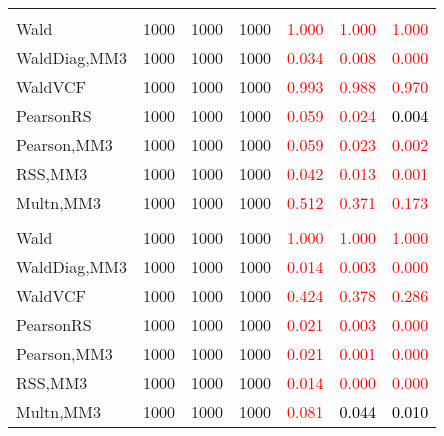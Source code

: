 \documentclass[
]{article}
\begin{document}
\begin{table}[H]
{\begin{tabular}[t]{lrrrrrr}
\addlinespace[0.3em]
\multicolumn{7}{l}{\textbf{2F 10V}}\\
\hspace{1em}Wald & 1000 & 1000 & 1000 & \textcolor{red}{1.000} & \textcolor{red}{1.000} & \vphantom{1} \textcolor{red}{1.000}\\
\hspace{1em}WaldDiag,MM3 & 1000 & 1000 & 1000 & \textcolor{red}{0.034} & \textcolor{red}{0.008} & \textcolor{red}{0.000}\\
\hspace{1em}WaldVCF & 1000 & 1000 & 1000 & \textcolor{red}{0.993} & \textcolor{red}{0.988} & \textcolor{red}{0.970}\\
\hspace{1em}PearsonRS & 1000 & 1000 & 1000 & \textcolor{red}{0.059} & \textcolor{red}{0.024} & \textcolor{black}{0.004}\\
\hspace{1em}Pearson,MM3 & 1000 & 1000 & 1000 & \textcolor{red}{0.059} & \textcolor{red}{0.023} & \textcolor{red}{0.002}\\
\hspace{1em}RSS,MM3 & 1000 & 1000 & 1000 & \textcolor{red}{0.042} & \textcolor{red}{0.013} & \textcolor{red}{0.001}\\
\hspace{1em}Multn,MM3 & 1000 & 1000 & 1000 & \textcolor{red}{0.512} & \textcolor{red}{0.371} & \textcolor{red}{0.173}\\
\addlinespace[0.3em]
\multicolumn{7}{l}{\textbf{3F 15V}}\\
\hspace{1em}Wald & 1000 & 1000 & 1000 & \textcolor{red}{1.000} & \textcolor{red}{1.000} & \textcolor{red}{1.000}\\
\hspace{1em}WaldDiag,MM3 & 1000 & 1000 & 1000 & \textcolor{red}{0.014} & \textcolor{red}{0.003} & \textcolor{red}{0.000}\\
\hspace{1em}WaldVCF & 1000 & 1000 & 1000 & \textcolor{red}{0.424} & \textcolor{red}{0.378} & \textcolor{red}{0.286}\\
\hspace{1em}PearsonRS & 1000 & 1000 & 1000 & \textcolor{red}{0.021} & \textcolor{red}{0.003} & \textcolor{red}{0.000}\\
\hspace{1em}Pearson,MM3 & 1000 & 1000 & 1000 & \textcolor{red}{0.021} & \textcolor{red}{0.001} & \textcolor{red}{0.000}\\
\hspace{1em}RSS,MM3 & 1000 & 1000 & 1000 & \textcolor{red}{0.014} & \textcolor{red}{0.000} & \textcolor{red}{0.000}\\
\hspace{1em}Multn,MM3 & 1000 & 1000 & 1000 & \textcolor{red}{0.081} & \textcolor{black}{0.044} & \textcolor{black}{0.010}\\
\bottomrule
\end{tabular}}
\endgroup{}
\end{table}
\end{document}
